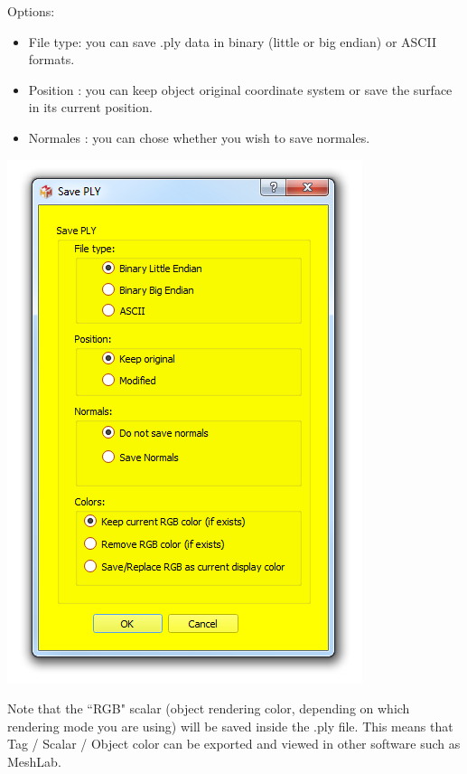\begin{minipage}{0.5\textwidth}
Options:
\begin{itemize}
\item File type: you can save .ply data in binary (little or big endian)
or ASCII formats.
\item Position : you can keep object original coordinate system or
save the surface in its current position.
\item Normales : you can chose whether you wish to save normales.
\end{itemize}

\end{minipage}    
\begin{minipage}{0.5\textwidth}\centering
  \includegraphics[scale=0.45]{images/07/surface/save_ply.png}
 \end{minipage} 

Note that the ``RGB" scalar (object rendering color, depending on which rendering mode you
are using) will be saved inside the .ply file. This means that Tag / Scalar / Object color can be exported and viewed in other software such as MeshLab.


